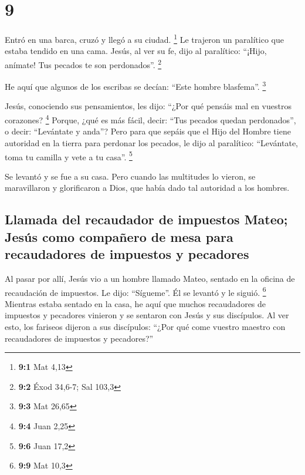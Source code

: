 \hypertarget{section-8}{%
\section{9}\label{section-8}}

 Entró en una barca, cruzó y llegó a su ciudad.
\footnote{\textbf{9:1} Mat 4,13}  Le trajeron un
paralítico que estaba tendido en una cama. Jesús, al ver su fe, dijo al
paralítico: ``¡Hijo, anímate! Tus pecados te son perdonados''.
\footnote{\textbf{9:2} Éxod 34,6-7; Sal 103,3}

 He aquí que algunos de los escribas se decían: ``Este
hombre blasfema''. \footnote{\textbf{9:3} Mat 26,65}

 Jesús, conociendo sus pensamientos, les dijo: ``¿Por qué
pensáis mal en vuestros corazones? \footnote{\textbf{9:4} Juan 2,25}
 Porque, ¿qué es más fácil, decir: ``Tus pecados quedan
perdonados'', o decir: ``Levántate y anda''?  Pero para
que sepáis que el Hijo del Hombre tiene autoridad en la tierra para
perdonar los pecados, le dijo al paralítico: ``Levántate, toma tu
camilla y vete a tu casa''. \footnote{\textbf{9:6} Juan 17,2}

 Se levantó y se fue a su casa.  Pero cuando
las multitudes lo vieron, se maravillaron y glorificaron a Dios, que
había dado tal autoridad a los hombres.

\hypertarget{llamada-del-recaudador-de-impuestos-mateo-jesuxfas-como-compauxf1ero-de-mesa-para-recaudadores-de-impuestos-y-pecadores}{%
\subsection{Llamada del recaudador de impuestos Mateo; Jesús como
compañero de mesa para recaudadores de impuestos y
pecadores}\label{llamada-del-recaudador-de-impuestos-mateo-jesuxfas-como-compauxf1ero-de-mesa-para-recaudadores-de-impuestos-y-pecadores}}

 Al pasar por allí, Jesús vio a un hombre llamado Mateo,
sentado en la oficina de recaudación de impuestos. Le dijo: ``Sígueme''.
Él se levantó y le siguió. \footnote{\textbf{9:9} Mat 10,3}
 Mientras estaba sentado en la casa, he aquí que muchos
recaudadores de impuestos y pecadores vinieron y se sentaron con Jesús y
sus discípulos.  Al ver esto, los fariseos dijeron a sus
discípulos: ``¿Por qué come vuestro maestro con recaudadores de
impuestos y pecadores?''

